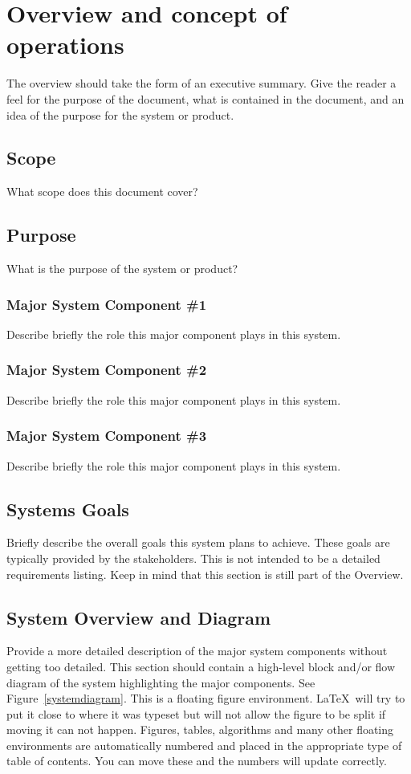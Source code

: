 
\chapter{Overview and concept of operations}

The overview should take the form of an executive summary.  Give the reader a feel 
for the purpose of the document, what is contained in the document, and an idea 
of the purpose for the system or product. 


\section{Scope}
What scope does this document cover? 


\section{Purpose}
What is the purpose of the system or product? 


\subsection{Major System Component \#1}
Describe briefly the role this major component plays in this system. 

\subsection{Major System Component \#2}
Describe briefly the role this major component plays in this system. 

\subsection{Major System Component \#3}
Describe briefly the role this major component plays in this system. 

\section{Systems Goals}
Briefly describe the overall goals this system plans to achieve.  These goals are 
typically provided by the stakeholders.  This is not intended to be a detailed 
requirements listing.  Keep in mind that this section is still part of the Overview. 

\section{System Overview and Diagram}
Provide a more detailed description of the major system components without getting 
too detailed.  This section should contain a high-level block and/or flow diagram 
of the system highlighting the major components.   See Figure~\ref{systemdiagram}.    This is a floating figure environment.  \LaTeX\ will try to put it close to where it was typeset but will not allow the figure to be split if moving it can not happen.   Figures, tables, algorithms and many other floating environments are automatically numbered and placed in the appropriate type of table of contents.  You can move these and the numbers will update correctly.

